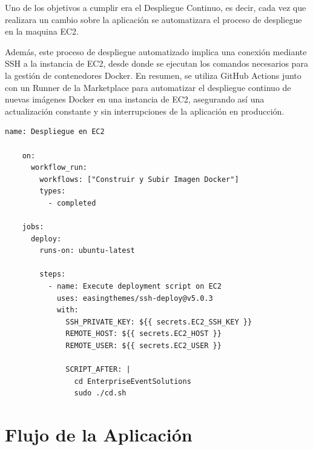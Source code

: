 Uno de los objetivos a cumplir era el Despliegue Continuo, es decir, cada vez que realizara un cambio sobre la aplicación se automatizara el proceso 
de despliegue en la maquina EC2. 

Además, este proceso de despliegue automatizado implica una conexión mediante SSH a la instancia de EC2, desde donde se ejecutan los comandos necesarios
para la gestión de contenedores Docker. En resumen, se utiliza GitHub Actions junto con un Runner de la Marketplace para automatizar el despliegue continuo
de nuevas imágenes Docker en una instancia de EC2, asegurando así una actualización constante y sin interrupciones de la aplicación en producción.

\begin{lstlisting}[language=HTML, caption=Action de Automatización CD]
    name: Despliegue en EC2
    
    on:
      workflow_run:
        workflows: ["Construir y Subir Imagen Docker"]
        types:
          - completed
    
    jobs:
      deploy:
        runs-on: ubuntu-latest
        
        steps:
          - name: Execute deployment script on EC2
            uses: easingthemes/ssh-deploy@v5.0.3
            with:
              SSH_PRIVATE_KEY: ${{ secrets.EC2_SSH_KEY }}
              REMOTE_HOST: ${{ secrets.EC2_HOST }}
              REMOTE_USER: ${{ secrets.EC2_USER }}
              
              SCRIPT_AFTER: |
                cd EnterpriseEventSolutions
                sudo ./cd.sh
    \end{lstlisting}
\newpage
\section{Flujo de la Aplicación}

